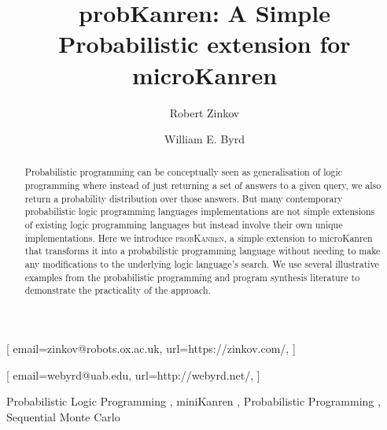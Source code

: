\documentclass[
]{ceurart}
\begin{document}


\title{probKanren: A Simple Probabilistic extension for microKanren}

\author[1]{Robert Zinkov}[%
email=zinkov@robots.ox.ac.uk,
url=https://zinkov.com/,
]
\address[1]{Dept. of Engineering Science, University of Oxford,
  25 Banbury Rd, Oxford, UK}

\author[2]{William E. Byrd}[%
email=webyrd@uab.edu,
url=http://webyrd.net/,
]
\address[2]{Hugh Kaul Precision Medicine Institute, University of Alabama at Birmingham, 705 20th Street S., Birmingham, AL 35233, United States of America}

\begin{abstract}
  Probabilistic programming can be conceptually seen as generalisation
  of logic programming where instead of just returning a set of
  answers to a given query, we also return a probability distribution
  over those answers. But many contemporary probabilistic logic
  programming languages implementations are not simple extensions of
  existing logic programming languages but instead involve their own
  unique implementations. Here we introduce \textsc{probKanren}, a simple
  extension to microKanren that transforms it into a probabilistic
  programming language without needing to make any modifications to
  the underlying logic language's search. We use several illustrative
  examples from the probabilistic programming and program synthesis
  literature to demonstrate the practicality of the approach.

  
\end{abstract}

\begin{keywords}
  Probabilistic Logic Programming \sep
  miniKanren \sep
  Probabilistic Programming \sep
  Sequential Monte Carlo
\end{keywords}
\end{document}
